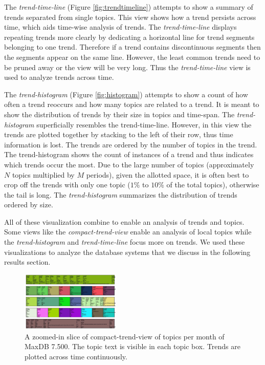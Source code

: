 \documentclass[times, 10pt,twocolumn]{article}
\begin{document}
The \emph{trend-time-line} (Figure \ref{fig:trendtimeline})
attempts to show a summary of trends separated from single topics. This view shows how a trend persists across time, which aids time-wise analysis of trends.
The \emph{trend-time-line} displays repeating trends more clearly by
dedicating a horizontal line for trend segments belonging to one
trend. Therefore if a trend contains discontinuous segments then
the segments appear on the same line.  However, the least common
trends need to be pruned away or the view will be very long. 
Thus the \emph{trend-time-line} view is used to analyze trends across time.

 The \emph{trend-histogram} (Figure \ref{fig:histogram}) attempts
  to show a count of how often a trend reoccurs and how many topics
  are related to a trend. It is meant to show the distribution of
  trends by their size in topics and time-span.  The
\emph{trend-histogram} superficially resembles the trend-time-line.
However, in this view the trends are plotted together by stacking to
the left of their row, thus time information is lost.  The trends are
ordered by the number of topics in the trend.  The trend-histogram
shows the count of instances of a trend and thus indicates which
trends occur the most. Due to the large number of topics
(approximately $N$ topics multiplied by $M$ periods), given the
allotted space, it is often best to crop off the trends with only one
topic ($1\%$ to $10\%$ of the total topics), otherwise the tail is
long. The \emph{trend-histogram} summarizes the distribution of
trends ordered by size.

 All of these visualization combine to enable an analysis of
  trends and topics. Some views like the \emph{compact-trend-view}
  enable an analysis of local topics while the \emph{trend-histogram}
  and \emph{trend-time-line} focus more on trends. We used these
  visualizations to analyze the database systems that we discuss in
  the following results section.  

\begin{figure}[t]
  \centering
  \includegraphics[width=0.42\textwidth]{fixed-time-smear-plot-cropped}
  \caption{A zoomed-in slice of compact-trend-view of topics per month of MaxDB 7.500. The topic text is visible in each topic box. Trends are plotted across time continuously.}
  \label{fig:zoomedsmear}
\end{figure}
\end{document}
